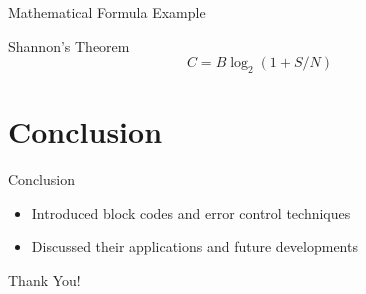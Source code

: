 \documentclass{beamer}
\begin{document}
\begin{frame}{Mathematical Formula Example}
    \begin{block}{Shannon's Theorem}
        \[
        C = B \log_2(1 + S/N)
        \]
    \end{block}
\end{frame}

\section{Conclusion}
\begin{frame}{Conclusion}
    \begin{itemize}
        \item Introduced block codes and error control techniques
        \item Discussed their applications and future developments
    \end{itemize}
\end{frame}

\begin{frame}
    \centering
    \Huge Thank You!
\end{frame}
\end{document}
